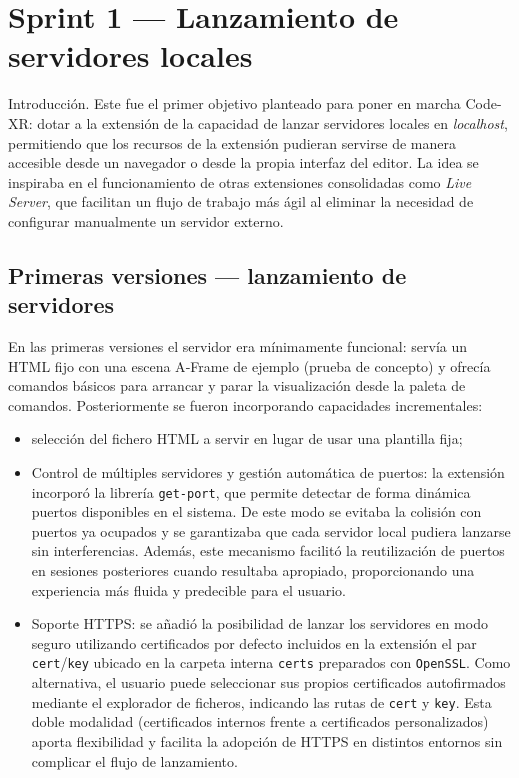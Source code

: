 \documentclass[a4paper, 12pt]{book}
\begin{document}

\section{Sprint 1 — Lanzamiento de servidores locales}
\label{sec:sprint-servers}

Introducción. Este fue el primer objetivo planteado para poner en marcha Code-XR: dotar a la extensión de la capacidad de lanzar servidores locales en \emph{localhost}, permitiendo que los recursos de la extensión pudieran servirse de manera accesible desde un navegador o desde la propia interfaz del editor. La idea se inspiraba en el funcionamiento de otras extensiones consolidadas como \emph{Live Server}\cite{liveserver}, que facilitan un flujo de trabajo más ágil al eliminar la necesidad de configurar manualmente un servidor externo.  

\subsection{Primeras versiones — lanzamiento de servidores}
En las primeras versiones el servidor era mínimamente funcional: servía un HTML fijo con una escena A‑Frame de ejemplo (prueba de concepto) y ofrecía comandos básicos para arrancar y parar la visualización desde la paleta de comandos. Posteriormente se fueron incorporando capacidades incrementales:

\begin{itemize}
  \item selección del fichero HTML a servir en lugar de usar una plantilla fija;
  \item Control de múltiples servidores y gestión automática de puertos: la extensión incorporó la librería \texttt{get-port}\cite{get-port}, que permite detectar de forma dinámica puertos disponibles en el sistema. De este modo se evitaba la colisión con puertos ya ocupados y se garantizaba que cada servidor local pudiera lanzarse sin interferencias. Además, este mecanismo facilitó la reutilización de puertos en sesiones posteriores cuando resultaba apropiado, proporcionando una experiencia más fluida y predecible para el usuario.
  \item Soporte HTTPS: se añadió la posibilidad de lanzar los servidores en modo seguro utilizando certificados por defecto incluidos en la extensión el par \texttt{cert}/\texttt{key} ubicado en la carpeta interna \texttt{certs} preparados con \texttt{OpenSSL}\cite{openssl}. Como alternativa, el usuario puede seleccionar sus propios certificados autofirmados mediante el explorador de ficheros, indicando las rutas de \texttt{cert} y \texttt{key}. Esta doble modalidad (certificados internos frente a certificados personalizados) aporta flexibilidad y facilita la adopción de HTTPS en distintos entornos sin complicar el flujo de lanzamiento.
\end{itemize}
\end{document}
